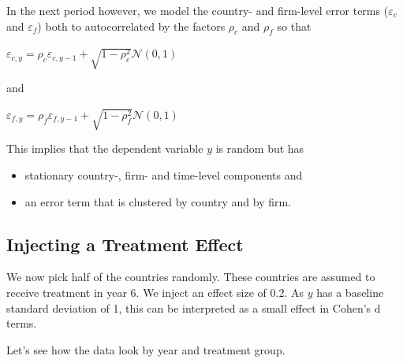 \documentclass[
  letterpaper,
  DIV=11,
  numbers=noendperiod]{scrartcl}
\providecommand{\tightlist}{%
  \setlength{\itemsep}{0pt}\setlength{\parskip}{0pt}}\usepackage{longtable,booktabs,array}
\begin{document}
In the next period however, we model the country- and firm-level error
terms (\(\varepsilon_c\) and \(\varepsilon_f\)) both to autocorrelated
by the factors \(\rho_{c}\) and \(\rho_f\) so that

\(\varepsilon_{c,y} = \rho_{c}\varepsilon_{c,y-1} + \sqrt{1-\rho_{c}^2}\mathcal{N}(0,1)\)

and

\(\varepsilon_{f,y} = \rho_{f}\varepsilon_{f,y-1} + \sqrt{1-\rho_{f}^2}\mathcal{N}(0,1)\)

This implies that the dependent variable \(y\) is random but has

\begin{itemize}
\tightlist
\item
  stationary country-, firm- and time-level components and
\item
  an error term that is clustered by country and by firm.
\end{itemize}

\subsection{Injecting a Treatment
Effect}\label{injecting-a-treatment-effect}

We now pick half of the countries randomly. These countries are assumed
to receive treatment in year 6. We inject an effect size of 0.2. As
\(y\) has a baseline standard deviation of 1, this can be interpreted as
a small effect in Cohen's d terms.

Let's see how the data look by year and treatment group.
\end{document}
